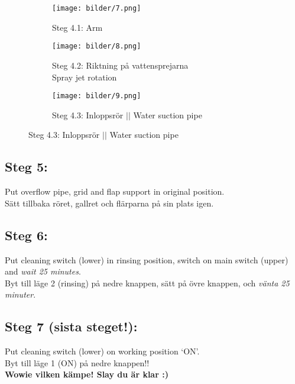 \documentclass{article}
\begin{document}

\begin{figure}[h!]
    \centering
    \begin{subfigure}[t]{0.45\textwidth}
        \centering
        \texttt{[image: bilder/7.png]}
        \caption*{Steg 4.1: Arm}
    \end{subfigure}
    \hfill
    \begin{subfigure}[t]{0.45\textwidth}
        \centering
        \texttt{[image: bilder/8.png]}
        \caption*{Steg 4.2: Riktning på vattensprejarna \\ Spray jet rotation}
    \end{subfigure}
    \hfill
    \vspace{0.3cm}
    \begin{subfigure}[t]{0.45\textwidth}
        \centering
        \texttt{[image: bilder/9.png]}
        \caption*{Steg 4.3: Inloppsrör $||$ Water suction pipe}
    \end{subfigure}
\end{figure}



\subsection*{Steg 5:}
Put overflow pipe, grid and flap support in original position. \\ Sätt tillbaka röret, gallret och flärparna på sin plats igen.

\subsection*{Steg 6:}
Put cleaning switch (lower) in rinsing position, switch on main switch (upper) and \emph{wait 25 minutes}. \\ Byt till läge 2 (rinsing) på nedre knappen, sätt på övre knappen, och \emph{vänta 25 minuter}.

\subsection*{Steg 7 (sista steget!):}
Put cleaning switch (lower) on working position ‘ON’. \\ Byt till läge 1 (ON) på nedre knappen!! \\

\centering
\textbf{Wowie vilken kämpe! Slay  du är klar :) }
\end{document}
